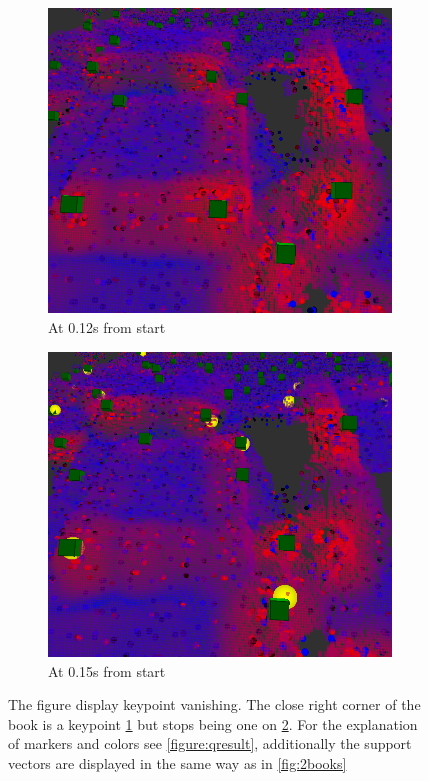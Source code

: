 \begin{figure}
\centering
       \begin{subfigure}[b]{0.45\textwidth}
                \includegraphics[width=\textwidth]{book12.png}
                \caption{At 0.12s from start}
                \label{figure:book012}
       \end{subfigure}
       \begin{subfigure}[b]{0.45\textwidth}
                \includegraphics[width=\textwidth]{book15.png}
                \caption{At 0.15s from start}
                \label{figure:book015}
       \end{subfigure}
       \caption{The figure display keypoint vanishing. The close right corner of the book is a keypoint \ref{figure:book012} but stops being one on \ref{figure:book015}. For the explanation of markers and colors see \ref{figure:qresult}, additionally the support vectors are displayed in the same way as in \ref{fig:2books}}
        \label{figure:vanish}
\end{figure}